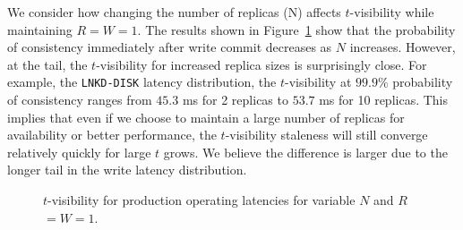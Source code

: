 \documentclass{vldb}
\begin{document}
We consider how changing the number of replicas (N) affects
$t$-visibility while maintaining $R$$=$$W$$=$$1$. The results shown in
Figure~\ref{fig:varyn} show that the probability of consistency
immediately after write commit decreases as $N$ increases.  However,
at the tail, the $t$-visibility for increased replica sizes is
surprisingly close.  For example, the \texttt{LNKD-DISK} latency
distribution, the $t$-visibility at $99.9\%$ probability of
consistency ranges from $45.3$ ms for 2 replicas to $53.7$ ms for 10
replicas.  This implies that even if we choose to maintain a large
number of replicas for availability or better performance, the
$t$-visibility staleness will still converge relatively quickly for large $t$
grows. We believe the difference is larger due to the longer tail in
the write latency distribution.

\begin{figure}
\centering
{}
\caption{$t$-visibility for production operating latencies for variable $N$ and $R$$=$$W$$=$$1$.}
\label{fig:varyn}
\end{figure}
\end{document}
